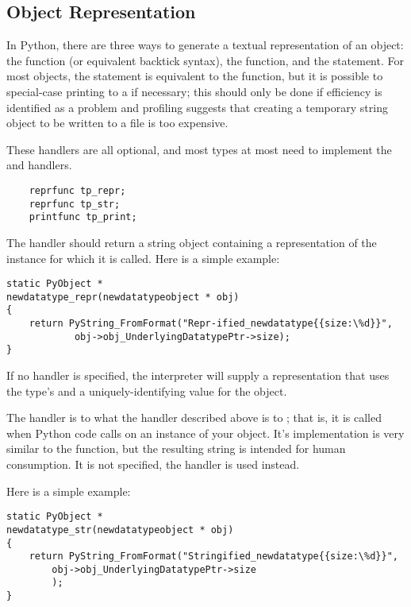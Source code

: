 \subsection{Object Representation}

In Python, there are three ways to generate a textual representation
of an object: the  function (or
equivalent backtick syntax), the 
function, and the  statement.  For most objects, the
 statement is equivalent to the 
function, but it is possible to special-case printing to a
 if necessary; this should only be done if efficiency is
identified as a problem and profiling suggests that creating a
temporary string object to be written to a file is too expensive.

These handlers are all optional, and most types at most need to
implement the  and  handlers.

\begin{verbatim}
    reprfunc tp_repr;
    reprfunc tp_str;
    printfunc tp_print;
\end{verbatim}

The  handler should return a string object containing
a representation of the instance for which it is called.  Here is a
simple example:

\begin{verbatim}
static PyObject *
newdatatype_repr(newdatatypeobject * obj)
{
    return PyString_FromFormat("Repr-ified_newdatatype{{size:\%d}}",
            obj->obj_UnderlyingDatatypePtr->size);
}
\end{verbatim}

If no  handler is specified, the interpreter will
supply a representation that uses the type's  and a
uniquely-identifying value for the object.

The  handler is to  what the
 handler described above is to ; that
is, it is called when Python code calls  on an
instance of your object.  It's implementation is very similar to the
 function, but the resulting string is intended for
human consumption.  It  is not specified, the
 handler is used instead.

Here is a simple example:

\begin{verbatim}
static PyObject *
newdatatype_str(newdatatypeobject * obj)
{
    return PyString_FromFormat("Stringified_newdatatype{{size:\%d}}",
        obj->obj_UnderlyingDatatypePtr->size
        );
}
\end{verbatim}

